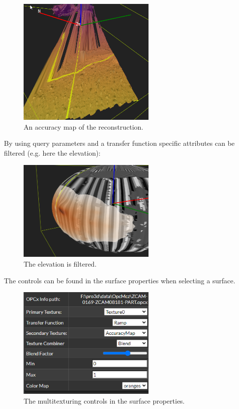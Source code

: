 \begin{figure}[h!]
	\centering
	\includegraphics[width=0.6\textwidth]{pics/AccuracyMap.png}
	\caption{An accuracy map of the reconstruction.}
\end{figure}

By using query parameters and a transfer function specific attributes can be filtered (e.g. here the elevation):

\begin{figure}[h!]
	\centering
	\includegraphics[width=0.6\textwidth]{pics/FilteredElevation.png}
	\caption{The elevation is filtered.}
\end{figure}

The controls can be found in the surface properties when selecting a surface. 

\begin{figure}[h!]
	\centering
	\includegraphics[width=0.6\textwidth]{pics/MultitexControls.png}
	\caption{The multitexturing controls in the surface properties.}
\end{figure}


